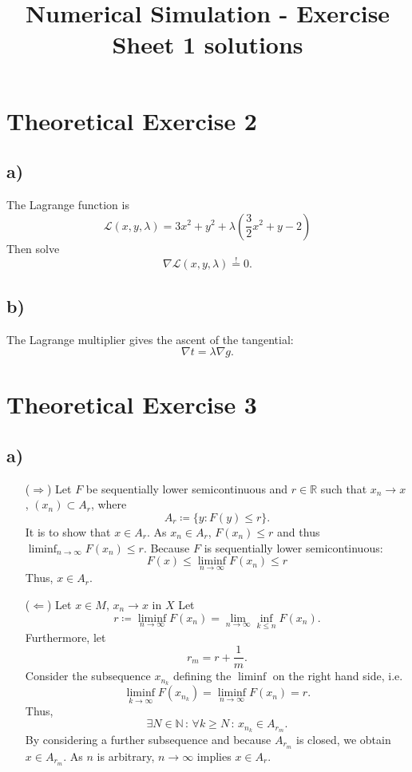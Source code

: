\documentclass[oneside,a4paper]{amsart}
\newcommand{\R}{\ensuremath{\mathbb{R}}}
\newcommand{\N}{\ensuremath{\mathbb{N}}}
\begin{document}
\title{Numerical Simulation - Exercise Sheet 1 solutions}
\maketitle{}
\section*{Theoretical Exercise 2}
\subsection*{a)}
The Lagrange function is
\[
	\mathcal{L}(x, y, \lambda) = 3x^2 + y^2 + \lambda \left(\frac{3}{2} x^2 + y - 2\right)
\]
Then solve
\[
	\nabla \mathcal{L}(x, y, \lambda) \overset{!}{=} 0.
\]
\subsection*{b)}
The Lagrange multiplier gives the ascent of the tangential:
\[
	\nabla t = \lambda \nabla g.
\]
\section*{Theoretical Exercise 3}
\subsection*{a)}
\begin{itemize}
\item[($\Rightarrow$)] Let $F$ be sequentially lower semicontinuous and $r \in \R$ such that $x_n \to x$, $(x_n) \subset A_r$, where
\[
	A_r \coloneqq \{ y : F(y) \leq r \}.
\]
It is to show that $x \in A_r$.
As $x_n \in A_r$, $F(x_n) \leq r$ and thus $\liminf_{n \to \infty} F(x_n) \leq r$.
Because $F$ is sequentially lower semicontinuous:
\[
	F(x) \leq \liminf_{n \to \infty} F(x_n) \leq r
\]
Thus, $x \in A_r$.
\item[($\Leftarrow$)] Let $x \in M$, $x_n \to x$ in $X$
Let
\[
	r \coloneqq \liminf_{n \to \infty} F(x_n) = \lim_{n \to \infty} \inf_{k \leq n} F(x_n).
\]
Furthermore, let
\[
	r_m = r + \frac{1}{m}.
\]
Consider the subsequence $x_{n_k}$ defining the $\liminf$ on the right hand side, i.e.
\[
	\liminf_{k \to \infty} F(x_{n_k}) = \liminf_{n \to \infty} F(x_n) = r.
\]
Thus,
\[
	\exists N \in \N \, : \, \forall k \geq N \, : \, x_{n_k} \in A_{r_m}.
\]
By considering a further subsequence and because $A_{r_m}$ is closed, we obtain $x \in A_{r_m}$.
As $n$ is arbitrary, $n \to \infty$ implies $x \in A_r$.
\end{itemize}
\end{document}
